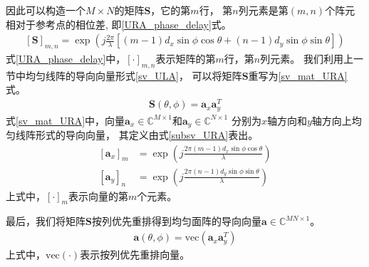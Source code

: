 \documentclass[master]{thesis-uestc}
\begin{document}
因此可以构造一个$M \times N$的矩阵$\bm{S}$，它的第$m$行，
第$n$列元素是第$(m,n)$个阵元相对于参考点的相位差,
即\eqref{URA_phase_delay}式。
\begin{equation}\label{URA_phase_delay}
    \begin{aligned}
        \left[\bm{S}\right]_{m,n} = 
        \exp\left(j\frac{2\pi}{\lambda}
                  \left[(m-1)d_x\sin\phi\cos\theta + (n-1)d_y\sin\phi\sin\theta\right]\right)
    \end{aligned}
\end{equation}
式\eqref{URA_phase_delay}中，$[\cdot]_{m,n}$表示矩阵的第$m$行，第$n$列元素。
我们利用上一节中均匀线阵的导向向量形式\eqref{sv_ULA}，
可以将矩阵$\bm{S}$重写为\eqref{sv_mat_URA}式。
\begin{equation}\label{sv_mat_URA}
    \begin{aligned}
        \bm{S}(\theta,\phi) = \bm{a}_x\bm{a}^T_y
    \end{aligned}
\end{equation}
式\eqref{sv_mat_URA}中，向量$\bm{a}_x\in\mathbb{C}^{M\times1}$和$\bm{a}_y\in\mathbb{C}^{N\times1}$
分别为$x$轴方向和$y$轴方向上均匀线阵形式的导向向量，
其定义由式\eqref{subsv_URA}表出。
\begin{subequations}\label{subsv_URA}
    \begin{align}
        \left[\bm{a}_x\right]_{m} &= 
        \exp\left(j\frac{2\pi(m-1)d_x\sin\phi\cos\theta}{\lambda}\right)
        \\
        \left[\bm{a}_y\right]_{n} &= 
        \exp\left(j\frac{2\pi(n-1)d_y\sin\phi\sin\theta}{\lambda}\right)
    \end{align}
\end{subequations}
上式中，$[\cdot]_m$表示向量的第$m$个元素。

最后，我们将矩阵$\bm{S}$按列优先重排得到均匀面阵的导向向量$\bm{a}\in\mathbb{C}^{MN\times1}$。
\begin{equation}\label{sv_URA}
    \begin{aligned}
        \bm{a}(\theta,\phi) = \text{vec}\left(\bm{a}_x\bm{a}_y^T\right)
    \end{aligned}
\end{equation}
上式中，$\text{vec}(\cdot)$表示按列优先重排向量。
\end{document}
